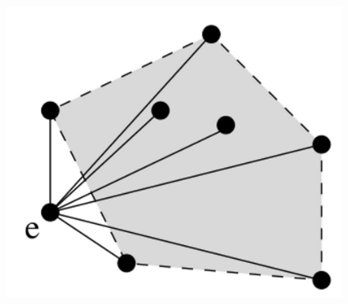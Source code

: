 \documentclass{beamer}
\begin{document}
\begin{frame}
\begin{columns}
\begin{column}{4cm}
\begin{figure}
        \includegraphics[scale=0.3]{./Ressources/Images/envelop_convex4.png}\\
        \label{Propa_Algo}
        \end{figure}
        \end{column}
        \end{columns}
  \end{frame}
\end{document}
